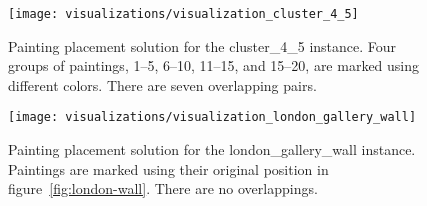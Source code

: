\begin{figure}[h!]
    \texttt{[image: visualizations/visualization\_cluster\_4\_5]}
    \caption[Painting placement solution for the cluster\_4\_5 instance]
        { Painting placement solution for the cluster\_4\_5 instance.
    Four groups of paintings, \numrange{1}{5}, \numrange{6}{10}, \numrange{11}{15}, and \numrange{15}{20}, are marked using different colors.
    There are seven overlapping pairs.}
    \label{fig:results:visualization-cluster-4-5}
\end{figure}

\begin{figure}[h!]
    \texttt{[image: visualizations/visualization\_london\_gallery\_wall]}
    \caption[Painting placement solution for the london\_gallery\_wall instance]
        { Painting placement solution for the london\_gallery\_wall instance.
    Paintings are marked using their original position in figure~\ref{fig:london-wall}.
    There are no overlappings.}
    \label{fig:results:visualization-london-gallery-wall}
\end{figure}
